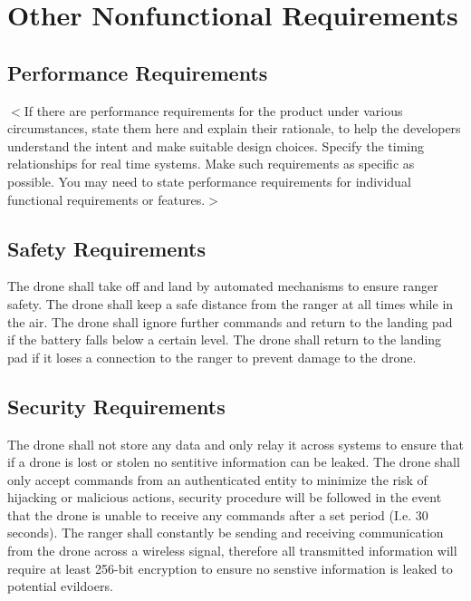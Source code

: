 \chapter{Other Nonfunctional Requirements}

\section{Performance Requirements}
$<$If there are performance requirements for the product under various
circumstances, state them here and explain their rationale, to help the
developers understand the intent and make suitable design choices. Specify the
timing relationships for real time systems. Make such requirements as specific
as possible. You may need to state performance requirements for individual
functional requirements or features.$>$

\section{Safety Requirements}
The drone shall take off and land by automated mechanisms to ensure ranger safety.
\newline
The drone shall keep a safe distance from the ranger at all times while in the air.
\newline
The drone shall ignore further commands and return to the landing pad if the battery falls below a certain level.
\newline
The drone shall return to the landing pad if it loses a connection to the ranger to prevent damage to the drone.
\newline

\section{Security Requirements}
The drone shall not store any data and only relay it across systems to ensure that if a drone is lost or stolen no sentitive information can be leaked.
The drone shall only accept commands from an authenticated entity to minimize the risk of hijacking or malicious actions, 
security procedure will be followed in the event that the drone is unable to receive any commands after a set period (I.e. 30 seconds).
The ranger shall constantly be sending and receiving communication from the drone across a wireless signal, 
therefore all transmitted information will require at least 256-bit encryption to ensure no senstive information is leaked to potential evildoers.

